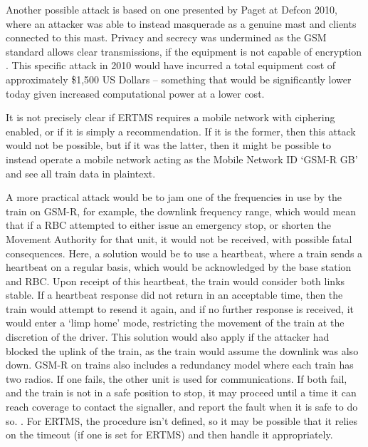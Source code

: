 \documentclass[twoside,11pt,a4paper]{article}
\begin{document}
Another possible attack is based on one presented by Paget at Defcon 2010, where an attacker was able to instead masquerade as a genuine mast and clients connected to this mast. Privacy and secrecy was undermined as the GSM standard allows clear transmissions, if the equipment is not capable of encryption \citep{Wired10a}. This specific attack in 2010 would have incurred a total equipment cost of approximately \$1,500 US Dollars -- something that would be significantly lower today given increased computational power at a lower cost.

It is not precisely clear if ERTMS requires a mobile network with ciphering enabled, or if it is simply a recommendation. If it is the former, then this attack would not be possible, but if it was the latter, then it might be possible to instead operate a mobile network acting as the Mobile Network ID `GSM-R GB' and see all train data in plaintext.

A more practical attack would be to jam one of the frequencies in use by the train on GSM-R, for example, the downlink frequency range, which would mean that if a RBC attempted to either issue an emergency stop, or shorten the Movement Authority for that unit, it would not be received, with possible fatal consequences. Here, a solution would be to use a heartbeat, where a train sends a heartbeat on a regular basis, which would be acknowledged by the base station and RBC. Upon receipt of this heartbeat, the train would consider both links stable. If a heartbeat response did not return in an acceptable time, then the train would attempt to resend it again, and if no further response is received, it would enter a `limp home' mode, restricting the movement of the train at the discretion of the driver. This solution would also apply if the attacker had blocked the uplink of the train, as the train would assume the downlink was also down. GSM-R on trains also includes a redundancy model where each train has two radios. If one fails, the other unit is used for communications. If both fail, and the train is not in a safe position to stop, it may proceed until a time it can reach coverage to contact the signaller, and report the fault when it is safe to do so. \citep{RSSB12a}. For ERTMS, the procedure isn't defined, so it may be possible that it relies on the timeout (if one is set for ERTMS) and then handle it appropriately.
\end{document}
